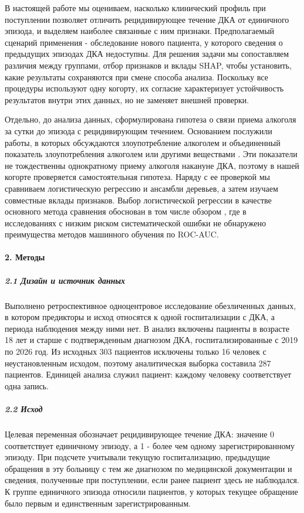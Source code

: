 \documentclass{crm-article}
\begin{document}
В настоящей работе мы оцениваем, насколько клинический профиль при поступлении позволяет отличить рецидивирующее течение ДКА от единичного эпизода, и выделяем наиболее связанные с ним признаки. Предполагаемый сценарий применения - обследование нового пациента, у которого сведения о предыдущих эпизодах ДКА недоступны. Для решения задачи мы сопоставляем различия между группами, отбор признаков и вклады SHAP, чтобы установить, какие результаты сохраняются при смене способа анализа. Поскольку все процедуры используют одну когорту, их согласие характеризует устойчивость результатов внутри этих данных, но не заменяет внешней проверки.

Отдельно, до анализа данных, сформулирована гипотеза о связи приема алкоголя за сутки до эпизода с рецидивирующим течением. Основанием послужили работы, в которых обсуждаются злоупотребление алкоголем \cite{ref7} и объединенный показатель злоупотребления алкоголем или другими веществами \cite{ref15}. Эти показатели не тождественны однократному приему алкоголя накануне ДКА, поэтому в нашей когорте проверяется самостоятельная гипотеза. Наряду с ее проверкой мы сравниваем логистическую регрессию и ансамбли деревьев, а затем изучаем совместные вклады признаков. Выбор логистической регрессии в качестве основного метода сравнения обоснован в том числе обзором \cite{ref16}, где в исследованиях с низким риском систематической ошибки не обнаружено преимущества методов машинного обучения по ROC-AUC.

\paragraph{2. Методы}\label{sec2}

\subparagraph{2.1 Дизайн и источник данных}\label{subsec2_1}

Выполнено ретроспективное одноцентровое исследование обезличенных данных, в котором предикторы и исход относятся к одной госпитализации с ДКА, а периода наблюдения между ними нет. В анализ включены пациенты в возрасте 18 лет и старше с подтвержденным диагнозом ДКА, госпитализированные с 2019 по 2026 год. Из исходных 303 пациентов исключены только 16 человек с неустановленным исходом, поэтому аналитическая выборка составила 287 пациентов. Единицей анализа служил пациент: каждому человеку соответствует одна запись.

\subparagraph{2.2 Исход}\label{subsec2_2}

Целевая переменная обозначает рецидивирующее течение ДКА: значение 0 соответствует единичному эпизоду, а 1 - более чем одному зарегистрированному эпизоду. При подсчете учитывали текущую госпитализацию, предыдущие обращения в эту больницу с тем же диагнозом по медицинской документации и сведения, полученные при поступлении, если ранее пациент здесь не наблюдался. К группе единичного эпизода относили пациентов, у которых текущее обращение было первым и единственным зарегистрированным.
\end{document}
